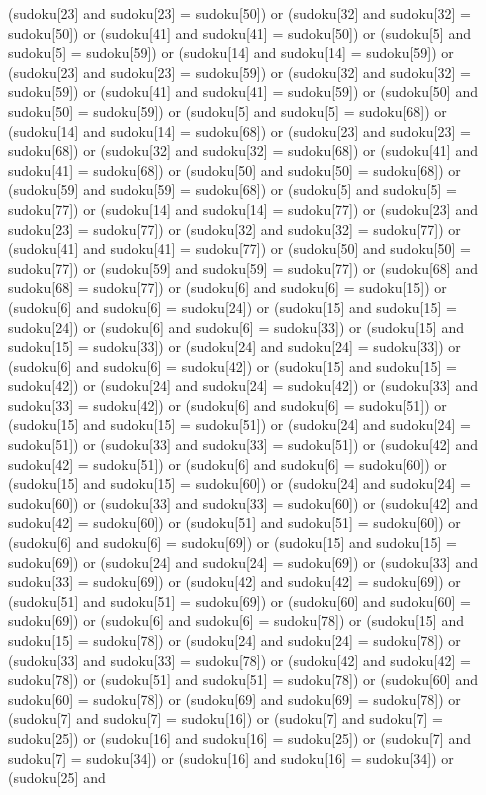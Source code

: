 \documentclass[8pt]{article}
\begin{document}
\begin{algorithm}[H]
(sudoku[23]  and sudoku[23] = sudoku[50]) or (sudoku[32]  and sudoku[32] = sudoku[50]) or (sudoku[41]  and sudoku[41] = sudoku[50]) or (sudoku[5]  and sudoku[5] = sudoku[59]) or (sudoku[14]  and sudoku[14] = sudoku[59]) or (sudoku[23]  and sudoku[23] = sudoku[59]) or (sudoku[32]  and sudoku[32] = sudoku[59]) or (sudoku[41]  and sudoku[41] = sudoku[59]) or (sudoku[50]  and sudoku[50] = sudoku[59]) or (sudoku[5]  and sudoku[5] = sudoku[68]) or (sudoku[14]  and sudoku[14] = sudoku[68]) or (sudoku[23]  and sudoku[23] = sudoku[68]) or (sudoku[32]  and sudoku[32] = sudoku[68]) or (sudoku[41]  and sudoku[41] = sudoku[68]) or (sudoku[50]  and sudoku[50] = sudoku[68]) or (sudoku[59]  and sudoku[59] = sudoku[68]) or (sudoku[5]  and sudoku[5] = sudoku[77]) or (sudoku[14]  and sudoku[14] = sudoku[77]) or (sudoku[23]  and sudoku[23] = sudoku[77]) or (sudoku[32]  and sudoku[32] = sudoku[77]) or (sudoku[41]  and sudoku[41] = sudoku[77]) or (sudoku[50]  and sudoku[50] = sudoku[77]) or (sudoku[59]  and sudoku[59] = sudoku[77]) or (sudoku[68]  and sudoku[68] = sudoku[77]) or (sudoku[6]  and sudoku[6] = sudoku[15]) or (sudoku[6]  and sudoku[6] = sudoku[24]) or (sudoku[15]  and sudoku[15] = sudoku[24]) or (sudoku[6]  and sudoku[6] = sudoku[33]) or (sudoku[15]  and sudoku[15] = sudoku[33]) or (sudoku[24]  and sudoku[24] = sudoku[33]) or (sudoku[6]  and sudoku[6] = sudoku[42]) or (sudoku[15]  and sudoku[15] = sudoku[42]) or (sudoku[24]  and sudoku[24] = sudoku[42]) or (sudoku[33]  and sudoku[33] = sudoku[42]) or (sudoku[6]  and sudoku[6] = sudoku[51]) or (sudoku[15]  and sudoku[15] = sudoku[51]) or (sudoku[24]  and sudoku[24] = sudoku[51]) or (sudoku[33]  and sudoku[33] = sudoku[51]) or (sudoku[42]  and sudoku[42] = sudoku[51]) or (sudoku[6]  and sudoku[6] = sudoku[60]) or (sudoku[15]  and sudoku[15] = sudoku[60]) or (sudoku[24]  and sudoku[24] = sudoku[60]) or (sudoku[33]  and sudoku[33] = sudoku[60]) or (sudoku[42]  and sudoku[42] = sudoku[60]) or (sudoku[51]  and sudoku[51] = sudoku[60]) or (sudoku[6]  and sudoku[6] = sudoku[69]) or (sudoku[15]  and sudoku[15] = sudoku[69]) or (sudoku[24]  and sudoku[24] = sudoku[69]) or (sudoku[33]  and sudoku[33] = sudoku[69]) or (sudoku[42]  and sudoku[42] = sudoku[69]) or (sudoku[51]  and sudoku[51] = sudoku[69]) or (sudoku[60]  and sudoku[60] = sudoku[69]) or (sudoku[6]  and sudoku[6] = sudoku[78]) or (sudoku[15]  and sudoku[15] = sudoku[78]) or (sudoku[24]  and sudoku[24] = sudoku[78]) or (sudoku[33]  and sudoku[33] = sudoku[78]) or (sudoku[42]  and sudoku[42] = sudoku[78]) or (sudoku[51]  and sudoku[51] = sudoku[78]) or (sudoku[60]  and sudoku[60] = sudoku[78]) or (sudoku[69]  and sudoku[69] = sudoku[78]) or (sudoku[7]  and sudoku[7] = sudoku[16]) or (sudoku[7]  and sudoku[7] = sudoku[25]) or (sudoku[16]  and sudoku[16] = sudoku[25]) or (sudoku[7]  and sudoku[7] = sudoku[34]) or (sudoku[16]  and sudoku[16] = sudoku[34]) or (sudoku[25]  and 
\end{algorithm}
\end{document}
